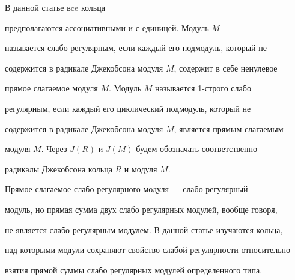  


 


В данной статье вce кольца 


предполагаются ассоциативными и с единицей. Модуль $M$ 


называется слабо регулярным, если каждый его подмодуль, который не 


содержится в радикале Джекобсона модуля $M$, содержит в себе ненулевое 


прямое слагаемое модуля $M$. Модуль $M$ называется 1-строго слабо 


регулярным, если каждый его циклический подмодуль, который не 


содержится в радикале Джекобсона модуля $M$, является прямым слагаемым 


модуля $M$. Через $J(R)$ и $J(M)$ будем обозначать соответственно 


радикалы Джекобсона кольца $R$ и модуля $M$. 


 


Прямое слагаемое слабо регулярного модуля --- слабо регулярный 


модуль, но прямая сумма двух слабо регулярных модулей, вообще говоря, 


не является слабо регулярным модулем. В данной статье изучаются кольца, 


над которыми модули сохраняют свойство слабой регулярности относительно 


взятия прямой суммы слабо регулярных модулей определенного типа. 


 


